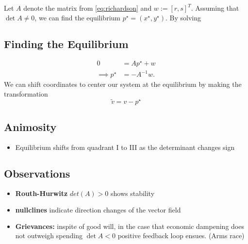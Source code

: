 \documentclass[12pt]{article}
\begin{document}
  Let $A$ denote the matrix from \autoref{eq:richardson} and $w:=\left[r,s\right]^T$. Assuming that $\det{A}\neq0$, we can find the equilibrium $p^\star=\left(x^\star,y^\star\right)$. By solving 
\subsection{Finding the Equilibrium}
    \begin{align*}
      0&=Ap^\star+w\\
      \implies p^\star&=-A^{-1}w.
    \end{align*}
  We can shift coordinates to center our system at the equilibrium by making the transformation
    \begin{equation}
      \tilde{v}=v-p^\star
    \end{equation}
  \subsection{Animosity}
  \begin{itemize}
    \item Equilibrium shifts from quadrant I to III as the determinant changes sign
  \end{itemize}

\subsection{Observations}
  \begin{itemize}
    \item \textbf{Routh-Hurwitz} $det(A)>0$ shows stability 
    \item \textbf{nullclines} indicate direction changes of the vector field
    \item \textbf{Grievances:} inspite of good will, in the case that economic dampening does not outweigh spending $\det{A} <0$ positive feedback loop ensues. (Arms race)
\end{itemize}
\end{document}
